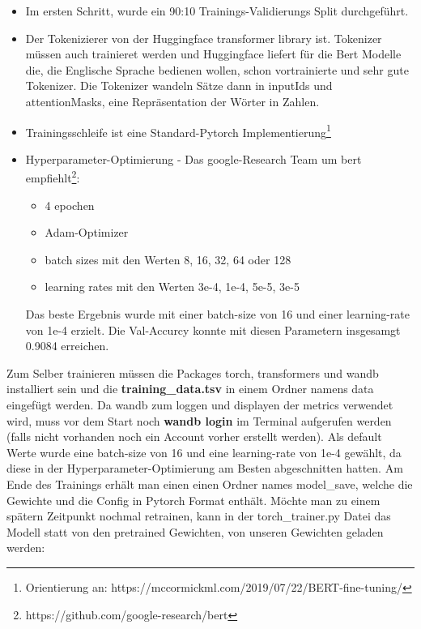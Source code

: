 \documentclass[10pt,a4paper]{article}
\begin{document}
\begin{itemize}
	\item Im ersten Schritt, wurde ein 90:10 Trainings-Validierungs Split durchgeführt. 
		
	\item Der Tokenizierer von der Huggingface transformer library ist. Tokenizer müssen auch trainieret werden und Huggingface liefert für die Bert Modelle die, die Englische Sprache bedienen wollen, schon vortrainierte und sehr gute Tokenizer. Die Tokenizer wandeln Sätze dann in inputIds und attentionMasks, eine Repräsentation der Wörter in Zahlen.

	\item Trainingsschleife ist eine Standard-Pytorch Implementierung\footnote{Orientierung an: https://mccormickml.com/2019/07/22/BERT-fine-tuning/}

	\item Hyperparameter-Optimierung - Das google-Research Team um bert empfiehlt\footnote{https://github.com/google-research/bert}:
		\begin{itemize}
			\item 4 epochen
			\item Adam-Optimizer
			\item batch sizes mit den Werten 8, 16, 32, 64 oder 128
			\item learning rates mit den Werten 3e-4, 1e-4, 5e-5, 3e-5
		\end{itemize}
		Das beste Ergebnis wurde mit einer batch-size von 16 und einer learning-rate von 1e-4 erzielt. Die Val-Accurcy konnte mit diesen Parametern insgesamgt 0.9084 erreichen.
\end{itemize}

Zum Selber trainieren müssen die Packages torch, transformers und wandb installiert sein und die \textbf{training\_data.tsv} in einem Ordner namens data eingefügt werden. Da wandb zum loggen und displayen der metrics verwendet wird, muss vor dem Start noch \textbf{wandb login} im Terminal aufgerufen werden (falls nicht vorhanden noch ein Account vorher erstellt werden). Als default Werte wurde eine batch-size von 16 und eine learning-rate von 1e-4 gewählt, da diese in der Hyperparameter-Optimierung am Besten abgeschnitten hatten. Am Ende des Trainings erhält man einen einen Ordner names model\_save, welche die Gewichte und die Config in Pytorch Format enthält. Möchte man zu einem spätern Zeitpunkt nochmal retrainen, kann in der torch\_trainer.py Datei das Modell statt von den pretrained Gewichten, von unseren Gewichten geladen werden:
\end{document}
